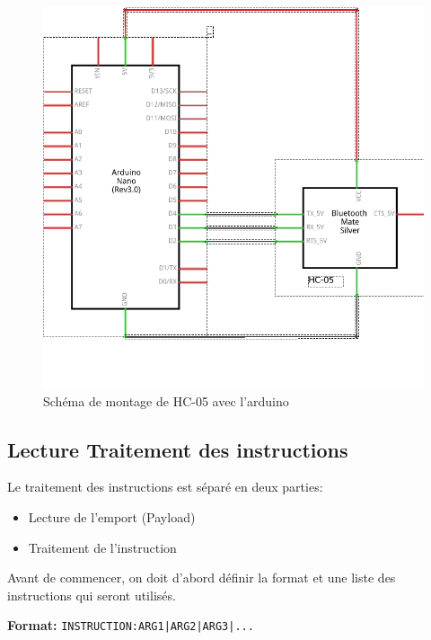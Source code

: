 \begin{figure}[!htbp]
    \centering
    \includegraphics[width=.7\linewidth]{assets/HC-05/circuit.png}
    \caption{Schéma de montage de HC-05 avec l'arduino}
\end{figure}

\FloatBarrier

\subsection{Lecture Traitement des instructions}

Le traitement des instructions est séparé en deux parties:
\begin{itemize}
    \item Lecture de l'emport (Payload)
    \item Traitement de l'instruction
\end{itemize}

Avant de commencer, on doit d'abord définir la format et une liste des instructions qui seront utilisés.

\textbf{Format:} \verb$INSTRUCTION:ARG1|ARG2|ARG3|...$

